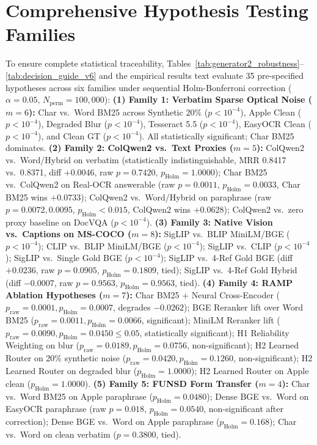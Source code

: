 \section{Comprehensive Hypothesis Testing Families}
\label{sec:appendix_holm}
{\scriptsize To ensure complete statistical traceability, Tables~\ref{tab:generator2_robustness}--\ref{tab:decision_guide_v6} and the empirical results text evaluate 35 pre-specified hypotheses across six families under sequential Holm-Bonferroni correction ($\alpha=0.05$, $N_{\text{perm}}=100{,}000$):
\textbf{(1) Family 1: Verbatim Sparse Optical Noise ($m=6$):} Char vs.\ Word BM25 across Synthetic 20\% ($p < 10^{-4}$), Apple Clean ($p < 10^{-4}$), Degraded Blur ($p < 10^{-4}$), Tesseract 5.5 ($p < 10^{-4}$), EasyOCR Clean ($p < 10^{-4}$), and Clean GT ($p < 10^{-4}$). All statistically significant; Char BM25 dominates.
\textbf{(2) Family 2: ColQwen2 vs.\ Text Proxies ($m=5$):} ColQwen2 vs.\ Word/Hybrid on verbatim (statistically indistinguishable, MRR 0.8417 vs.\ 0.8371, diff $+0.0046$, raw $p=0.7420$, $p_{\text{Holm}}=1.0000$); Char BM25 vs.\ ColQwen2 on Real-OCR answerable (raw $p=0.0011$, $p_{\text{Holm}}=0.0033$, Char BM25 wins $+0.0733$); ColQwen2 vs.\ Word/Hybrid on paraphrase (raw $p=0.0072, 0.0095$, $p_{\text{Holm}} < 0.015$, ColQwen2 wins $+0.0628$); ColQwen2 vs.\ zero proxy baseline on DocVQA ($p < 10^{-4}$).
\textbf{(3) Family 3: Native Vision vs.\ Captions on MS-COCO ($m=8$):} SigLIP vs.\ BLIP MiniLM/BGE ($p < 10^{-4}$); CLIP vs.\ BLIP MiniLM/BGE ($p < 10^{-4}$); SigLIP vs.\ CLIP ($p < 10^{-4}$); SigLIP vs.\ Single Gold BGE ($p < 10^{-4}$); SigLIP vs.\ 4-Ref Gold BGE (diff $+0.0236$, raw $p=0.0905$, $p_{\text{Holm}}=0.1809$, tied); SigLIP vs.\ 4-Ref Gold Hybrid (diff $-0.0007$, raw $p=0.9563$, $p_{\text{Holm}}=0.9563$, tied).
\textbf{(4) Family 4: RAMP Ablation Hypotheses ($m=7$):} Char BM25 + Neural Cross-Encoder ($p_{\text{raw}}=0.0001, p_{\text{Holm}}=0.0007$, degrades $-0.0262$); BGE Reranker lift over Word BM25 ($p_{\text{raw}}=0.0011, p_{\text{Holm}}=0.0066$, significant); MiniLM Reranker lift ($p_{\text{raw}}=0.0090, p_{\text{Holm}}=0.0450 \le 0.05$, statistically significant); H1 Reliability Weighting on blur ($p_{\text{raw}}=0.0189, p_{\text{Holm}}=0.0756$, non-significant); H2 Learned Router on 20\% synthetic noise ($p_{\text{raw}}=0.0420, p_{\text{Holm}}=0.1260$, non-significant); H2 Learned Router on degraded blur ($p_{\text{Holm}}=1.0000$); H2 Learned Router on Apple clean ($p_{\text{Holm}}=1.0000$).
\textbf{(5) Family 5: FUNSD Form Transfer ($m=4$):} Char vs.\ Word BM25 on Apple paraphrase ($p_{\text{Holm}}=0.0480$); Dense BGE vs.\ Word on EasyOCR paraphrase (raw $p=0.018$, $p_{\text{Holm}}=0.0540$, non-significant after correction); Dense BGE vs.\ Word on Apple paraphrase ($p_{\text{Holm}}=0.168$); Char vs.\ Word on clean verbatim ($p=0.3800$, tied).
}
